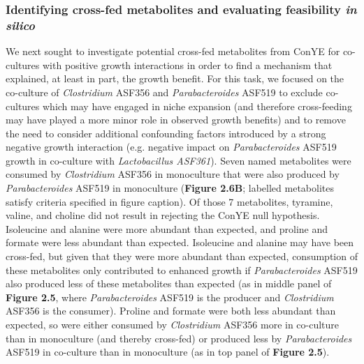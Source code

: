 \documentclass[11pt,twocolumn,notitlepage,openany,twoside]{book}
\begin{document}
\begin{refsection}
\subsubsection{Identifying cross-fed metabolites and evaluating feasibility \textit{in silico}}

We next sought to investigate potential cross-fed metabolites from ConYE for co-cultures with positive growth interactions in order to find a mechanism that explained, at least in part, the growth benefit. For this task, we focused on the co-culture of \textit{Clostridium} ASF356 and \textit{Parabacteroides} ASF519 to exclude co-cultures which may have engaged in niche expansion (and therefore cross-feeding may have played a more minor role in observed growth benefits) and to remove the need to consider additional confounding factors introduced by a strong negative growth interaction (e.g. negative impact on \textit{Parabacteroides} ASF519 growth in co-culture with \textit{Lactobacillus ASF361}). Seven named metabolites were consumed by \textit{Clostridium} ASF356 in monoculture that were also produced by \textit{Parabacteroides} ASF519 in monoculture (\textbf{Figure 2.6B}; labelled metabolites satisfy criteria specified in figure caption). Of those 7 metabolites, tyramine, valine, and choline did not result in rejecting the ConYE null hypothesis. Isoleucine and alanine were more abundant than expected, and proline and formate were less abundant than expected. Isoleucine and alanine may have been cross-fed, but given that they were more abundant than expected, consumption of these metabolites only contributed to enhanced growth if \textit{Parabacteroides} ASF519 also produced less of these metabolites than expected (as in middle panel of \textbf{Figure 2.5}, where \textit{Parabacteroides} ASF519 is the producer and \textit{Clostridium} ASF356 is the consumer). Proline and formate were both less abundant than expected, so were either consumed by \textit{Clostridium} ASF356 more in co-culture than in monoculture (and thereby cross-fed) or produced less by \textit{Parabacteroides} ASF519 in co-culture than in monoculture (as in top panel of \textbf{Figure 2.5}).


\end{refsection}
\end{document}
